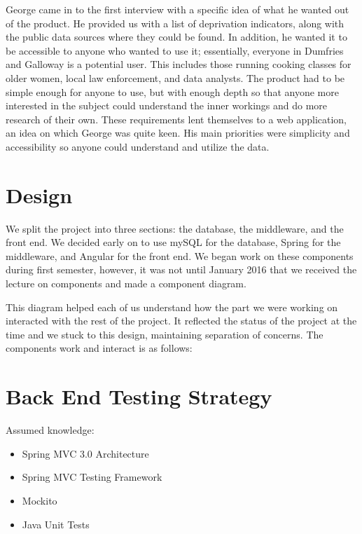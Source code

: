 \documentclass{l3proj}
\begin{document}
George came in to the first interview with a specific idea of what he wanted out of the product. He provided us with a list of deprivation indicators, along with the public data sources where they could be found. In addition, he wanted it to be accessible to anyone who wanted to use it; essentially, everyone in Dumfries and Galloway is a potential user. This includes those running cooking classes for older women, local law enforcement, and data analysts. The product had to be simple enough for anyone to use, but with enough depth so that anyone more interested in the subject could understand the inner workings and do more research of their own. These requirements lent themselves to a web application, an idea on which George was quite keen. His main priorities were simplicity and accessibility so anyone could understand and utilize the data.

\section{Design}
\label{designdocs}

We split the project into three sections: the database, the middleware, and the front end. We decided early on to use mySQL for the database, Spring for the middleware, and Angular for the front end. We began work on these components during first semester, however, it was not until January 2016 that we received the lecture on components and made a component diagram.



This diagram helped each of us understand how the part we were working on interacted with the rest of the project. It reflected the status of the project at the time and we stuck to this design, maintaining separation of concerns. The components work and interact is as follows:

\section{Back End Testing Strategy}
\label{backEndTesting}


Assumed knowledge:
\begin{itemize}
\item Spring MVC 3.0 Architecture 
\item Spring MVC Testing Framework
\item  Mockito
\item  Java Unit Tests
\end{itemize}
\end{document}
